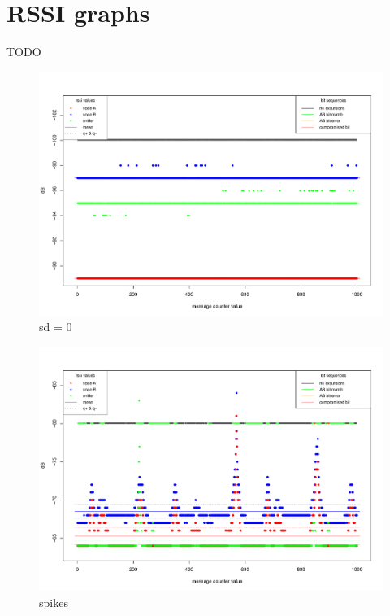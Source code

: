 \documentclass[
  print, %
  Table,   %
  nolof,     %
  nolot,     %
           oneside
]{fithesis3}
\begin{document}
\chapter{RSSI graphs} TODO
\begin{figure}[h!!!]
  \includegraphics[height=0.9\textwidth, angle = 90 ]{../images/graph_rssi_01.pdf}
\caption{sd = 0}
\label{fig:rssi_01}
\end{figure}

\begin{figure}
  \includegraphics[height=\textwidth, angle = 90 ]{../images/graph_rssi_02.pdf}
\caption{spikes}
\label{fig:rssi_02}
\end{figure}
\end{document}
